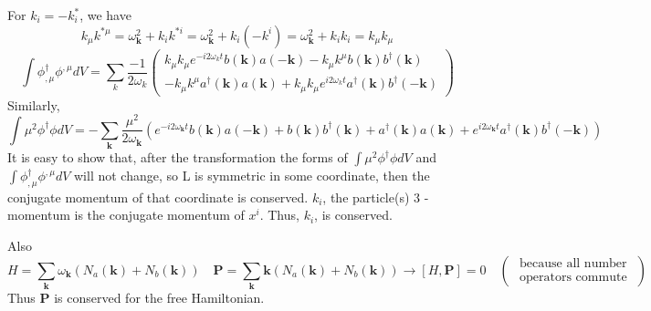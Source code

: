 For $k_{i}=-k^*_i$, we have $$
\left.k_{\mu} k^{* \mu}=\omega_{\mathbf{k}}^{2}+k_{i} k^{*i}=\omega_{\mathbf{k}}^{2}+k_{i}\left(-k^{i}\right)=\omega_{\mathbf{k}}^{2}+k_{i} k_{i}=k_{\mu} k_{\mu}\right.
$$
$$
\int \phi^{\dagger}_{,\mu} \phi^{, \mu} d V=\sum_{k} \frac{-1}{2 \omega_{k}}\left(\begin{array}{c}
{k_{\mu} k_{\mu} e^{-i 2 \omega_{k} t} b(\mathbf{k}) a(-\mathbf{k})-k_{\mu} k^{\mu} b(\mathbf{k}) b^{\dagger}(\mathbf{k})} \\
{-k_{\mu} k^{\mu} a^{\dagger}(\mathbf{k}) a(\mathbf{k})+k_{\mu} k_{\mu} e^{i 2 \omega_{k} t} a^{\dagger}(\mathbf{k}) b^{\dagger}(-\mathbf{k})}
\end{array}\right)
$$
Similarly,
$$
\int \mu^{2} \phi^{\dagger} \phi d V=-\sum_{\mathbf{k}} \frac{\mu^{2}}{2 \omega_{\mathbf{k}}}\left(e^{-i 2 \omega_{\mathbf{k}} t} b(\mathbf{k}) a(-\mathbf{k})+b(\mathbf{k}) b^{\dagger}(\mathbf{k})+a^{\dagger}(\mathbf{k}) a(\mathbf{k})+e^{i 2 \omega_{\mathbf{k}} t} a^{\dagger}(\mathbf{k}) b^{\dagger}(-\mathbf{k})\right)
$$
It is easy to show that, after the transformation the forms of $\int \mu^{2} \phi^{\dagger} \phi d V$ and $\int \phi^{\dagger}_{,\mu} \phi^{, \mu} d V$ will not change, so L is symmetric in some coordinate, then the conjugate momentum of that coordinate is conserved. $k_{i}$, the particle(s) 3 -momentum is the conjugate momentum of $x^{i} .$ Thus, $k_{i}$, is conserved.

Also
$$
H=\sum_{\mathbf{k}} \omega_{\mathbf{k}}\left(N_{a}(\mathbf{k})+N_{b}(\mathbf{k})\right) \quad \mathbf{P}=\sum_{\mathbf{k}} \mathbf{k}\left(N_{a}(\mathbf{k})+N_{b}(\mathbf{k})\right) \rightarrow[H, \mathbf{P}]=0 \quad\left(\begin{array}{ll}
{\text { because all number }} \\
{\text { operators commute }}
\end{array}\right)
$$
Thus $\mathbf{P}$ is conserved for the free Hamiltonian.